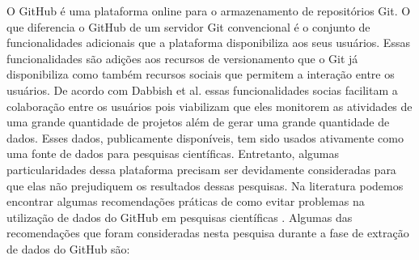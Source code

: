 O GitHub é uma plataforma online para o armazenamento de repositórios Git. O que diferencia o GitHub de um servidor Git convencional é o conjunto de funcionalidades adicionais que a plataforma disponibiliza aos seus usuários. Essas funcionalidades são adições aos recursos de versionamento que o Git já disponibiliza como também recursos sociais que permitem a interação entre os usuários. De acordo com  Dabbish et al. \cite{dabbish2012social} essas funcionalidades socias facilitam a colaboração entre os usuários pois viabilizam que eles monitorem as atividades de uma grande quantidade de projetos além de gerar uma grande quantidade de dados. Esses dados, publicamente disponíveis,  tem sido usados ativamente como uma fonte de dados para pesquisas científicas. Entretanto, algumas particularidades dessa plataforma precisam ser devidamente consideradas  para que elas não prejudiquem os resultados dessas pesquisas. Na literatura podemos encontrar algumas recomendações práticas de como evitar problemas na utilização de dados do GitHub em pesquisas científicas \cite{kalliamvakou2014promises,bird2009promises,tsay2014influence}.  Algumas das recomendações que foram consideradas nesta pesquisa durante a fase de extração de dados do GitHub são:

